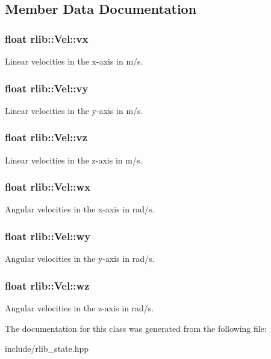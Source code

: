 \subsection{Member Data Documentation}
\hypertarget{classrlib_1_1Vel_aba9035c6e774edd37f2421ec376bb8f3}{
\subsubsection[{vx}]{\setlength{\rightskip}{0pt plus 5cm}float rlib\-::\-Vel\-::vx}}\label{classrlib_1_1Vel_aba9035c6e774edd37f2421ec376bb8f3}
Linear velocities in the x-\/axis in m/s. \hypertarget{classrlib_1_1Vel_acb4d80d6a58e1813359f9931d2fc6c9e}{
\subsubsection[{vy}]{\setlength{\rightskip}{0pt plus 5cm}float rlib\-::\-Vel\-::vy}}\label{classrlib_1_1Vel_acb4d80d6a58e1813359f9931d2fc6c9e}
Linear velocities in the y-\/axis in m/s. \hypertarget{classrlib_1_1Vel_aab3819a2079bb4654939da51cf896af3}{
\subsubsection[{vz}]{\setlength{\rightskip}{0pt plus 5cm}float rlib\-::\-Vel\-::vz}}\label{classrlib_1_1Vel_aab3819a2079bb4654939da51cf896af3}
Linear velocities in the z-\/axis in m/s. \hypertarget{classrlib_1_1Vel_adc2bc037dd0c69f0aaa972a41b8af55c}{
\subsubsection[{wx}]{\setlength{\rightskip}{0pt plus 5cm}float rlib\-::\-Vel\-::wx}}\label{classrlib_1_1Vel_adc2bc037dd0c69f0aaa972a41b8af55c}
Angular velocities in the x-\/axis in rad/s. \hypertarget{classrlib_1_1Vel_a40c6bb36dcb99cd88214e92c8169e7b1}{
\subsubsection[{wy}]{\setlength{\rightskip}{0pt plus 5cm}float rlib\-::\-Vel\-::wy}}\label{classrlib_1_1Vel_a40c6bb36dcb99cd88214e92c8169e7b1}
Angular velocities in the y-\/axis in rad/s. \hypertarget{classrlib_1_1Vel_a7f1cf4b7d0dba121ec54d0011eb1e4d5}{
\subsubsection[{wz}]{\setlength{\rightskip}{0pt plus 5cm}float rlib\-::\-Vel\-::wz}}\label{classrlib_1_1Vel_a7f1cf4b7d0dba121ec54d0011eb1e4d5}
Angular velocities in the z-\/axis in rad/s. 

The documentation for this class was generated from the following file\-:\begin{DoxyCompactItemize}
\item 
include/rlib\-\_\-state.\-hpp\end{DoxyCompactItemize}
